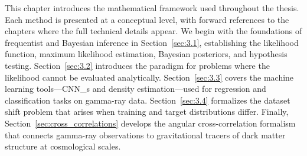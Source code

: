 This chapter introduces the mathematical framework used throughout the thesis.
Each method is presented at a conceptual level, with forward references to the chapters where the full technical details appear.
We begin with the foundations of frequentist and Bayesian inference in Section~\ref{sec:3.1}, establishing the likelihood function, maximum likelihood estimation, Bayesian posteriors, and hypothesis testing.
Section~\ref{sec:3.2} introduces the \SBI paradigm for problems where the likelihood cannot be evaluated analytically.
Section~\ref{sec:3.3} covers the machine learning tools---\glspl{CNN_} and density estimation---used for regression and classification tasks on gamma-ray data.
Section~\ref{sec:3.4} formalizes the dataset shift problem that arises when training and target distributions differ.
Finally, Section~\ref{sec:cross_correlations} develops the angular cross-correlation formalism that connects gamma-ray observations to gravitational tracers of dark matter structure at cosmological scales.
